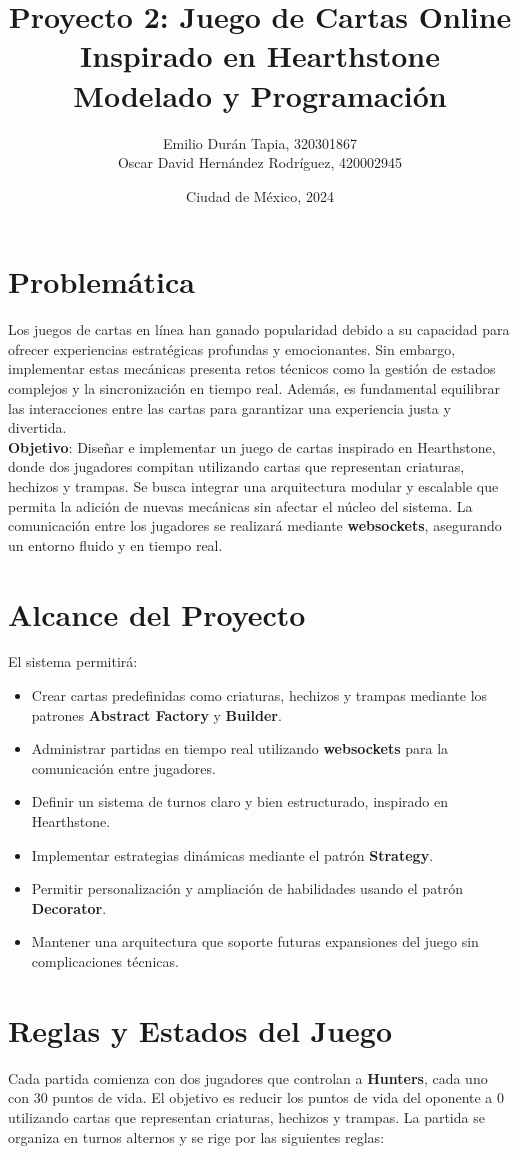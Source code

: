 \documentclass[12pt]{article}
\title{
    \textbf{Proyecto 2: Juego de Cartas Online \\
    Inspirado en Hearthstone} \\
    \large Modelado y Programación
}
\author{
    Emilio Durán Tapia, 320301867 \\ 
    Oscar David Hernández Rodríguez, 420002945
}
\date{Ciudad de México, 2024}
\begin{document}
\maketitle

\section*{Problemática}
Los juegos de cartas en línea han ganado popularidad debido a su capacidad para ofrecer experiencias estratégicas profundas y emocionantes. Sin embargo, implementar estas mecánicas presenta retos técnicos como la gestión de estados complejos y la sincronización en tiempo real. Además, es fundamental equilibrar las interacciones entre las cartas para garantizar una experiencia justa y divertida. \\

\textbf{Objetivo}: Diseñar e implementar un juego de cartas inspirado en Hearthstone, donde dos jugadores compitan utilizando cartas que representan criaturas, hechizos y trampas. Se busca integrar una arquitectura modular y escalable que permita la adición de nuevas mecánicas sin afectar el núcleo del sistema. La comunicación entre los jugadores se realizará mediante \textbf{websockets}, asegurando un entorno fluido y en tiempo real.

\section*{Alcance del Proyecto}
El sistema permitirá:
\begin{itemize}
    \item Crear cartas predefinidas como criaturas, hechizos y trampas mediante los patrones \textbf{Abstract Factory} y \textbf{Builder}.
    \item Administrar partidas en tiempo real utilizando \textbf{websockets} para la comunicación entre jugadores.
    \item Definir un sistema de turnos claro y bien estructurado, inspirado en Hearthstone.
    \item Implementar estrategias dinámicas mediante el patrón \textbf{Strategy}.
    \item Permitir personalización y ampliación de habilidades usando el patrón \textbf{Decorator}.
    \item Mantener una arquitectura que soporte futuras expansiones del juego sin complicaciones técnicas.
\end{itemize}

\section*{Reglas y Estados del Juego}
Cada partida comienza con dos jugadores que controlan a \textbf{Hunters}, cada uno con 30 puntos de vida. El objetivo es reducir los puntos de vida del oponente a 0 utilizando cartas que representan criaturas, hechizos y trampas. La partida se organiza en turnos alternos y se rige por las siguientes reglas:
\end{document}
